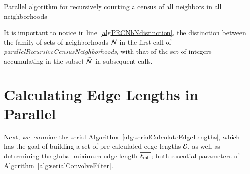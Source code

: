 \begin{algorithm}[ht]
	\DontPrintSemicolon


	\bigskip
\nl	{}

	\bigskip
\nl	{}
	\caption{Parallel algorithm for recursively counting a census of all neighbors in all neighborhoods \label{alg:parallelRecursiveCensusNeighborhoods}}
\end{algorithm}%
%
%

It is important to notice in line~\ref{algPRCNbNdistinction}, the distinction between the family of sets of neighborhoods $\mathcal{N}$ in the first call of \textit{parallelRecursiveCensusNeighborhoods}, with that of the set of integers accumulating in the subset $\widetilde{\mathcal{N}}$ in subsequent calls.

%
%
%
%
\section{Calculating Edge Lengths in Parallel}
\label{ch6sCELP}
Next, we examine the serial Algorithm~\ref{alg:serialCalculateEdgeLengths}, which has the goal of building a set of pre-calculated edge lengths $\mathcal{E}$, as well as determining the global minimum edge length $\overline{\ell_\text{min}}$; both essential parameters of Algorithm~\ref{alg:serialConvolveFilter}. 

